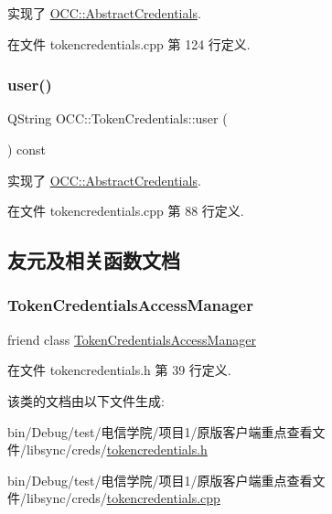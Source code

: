 实现了 \hyperlink{class_o_c_c_1_1_abstract_credentials_a13eca92c3c27886aecd39c6912b7e225}{O\+C\+C\+::\+Abstract\+Credentials}.



在文件 tokencredentials.\+cpp 第 124 行定义.

\mbox{\label{class_o_c_c_1_1_token_credentials_ab431dd443d32749da91f05f490a9e896}} 
\subsubsection{\texorpdfstring{user()}{user()}}
{\footnotesize\ttfamily Q\+String O\+C\+C\+::\+Token\+Credentials\+::user (\begin{DoxyParamCaption}{ }\end{DoxyParamCaption}) const\hspace{0.3cm}{\ttfamily [virtual]}}



实现了 \hyperlink{class_o_c_c_1_1_abstract_credentials_a8d96306a2d4af6c6dcffaa0b7c5b46f8}{O\+C\+C\+::\+Abstract\+Credentials}.



在文件 tokencredentials.\+cpp 第 88 行定义.



\subsection{友元及相关函数文档}
\mbox{\label{class_o_c_c_1_1_token_credentials_a8f133cc719794d652037e5404c1826ac}} 
\subsubsection{\texorpdfstring{Token\+Credentials\+Access\+Manager}{TokenCredentialsAccessManager}}
{\footnotesize\ttfamily friend class \hyperlink{class_o_c_c_1_1_token_credentials_access_manager}{Token\+Credentials\+Access\+Manager}\hspace{0.3cm}{\ttfamily [friend]}}



在文件 tokencredentials.\+h 第 39 行定义.



该类的文档由以下文件生成\+:\begin{DoxyCompactItemize}
\item 
bin/\+Debug/test/电信学院/项目1/原版客户端重点查看文件/libsync/creds/\hyperlink{tokencredentials_8h}{tokencredentials.\+h}\item 
bin/\+Debug/test/电信学院/项目1/原版客户端重点查看文件/libsync/creds/\hyperlink{tokencredentials_8cpp}{tokencredentials.\+cpp}\end{DoxyCompactItemize}
